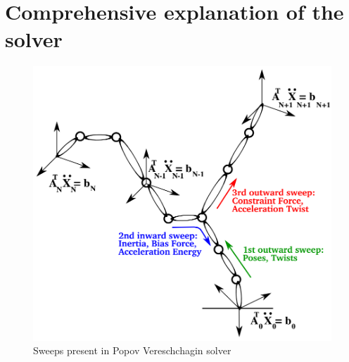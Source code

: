 \section{Comprehensive explanation of the solver}
\label{comprehensivesolver}
\begin{figure}[h!]
	\centering
	\includegraphics[scale=0.3]{images/solver1}
	\caption{Sweeps present in Popov Vereschchagin solver \cite{shakhimardanov2015composable}} 
\end{figure}
